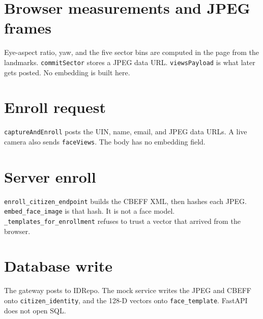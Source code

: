 \clearpage
\section{Browser measurements and JPEG frames}
\label{sec:browser}
\back
{\sffamily\small\color{ink}Eye-aspect ratio, yaw, and the five sector bins are computed in the page from the landmarks.
\texttt{commitSector} stores a JPEG data URL. \texttt{viewsPayload} is what later gets posted. No embedding is built here.}


\clearpage
\section{Enroll request}
\label{sec:enroll-request}
\back
{\sffamily\small\color{ink}\texttt{captureAndEnroll} posts the UIN, name, email, and JPEG data URLs.
A live camera also sends \texttt{faceViews}. The body has no embedding field.}


\clearpage
\section{Server enroll}
\label{sec:enroll-server}
\back
{\sffamily\small\color{ink}\texttt{enroll\_citizen\_endpoint} builds the CBEFF XML, then hashes each JPEG.
\texttt{embed\_face\_image} is that hash. It is not a face model.
\texttt{\_templates\_for\_enrollment} refuses to trust a vector that arrived from the browser.}


\clearpage
\section{Database write}
\label{sec:db-write}
\back
{\sffamily\small\color{ink}The gateway posts to IDRepo. The mock service writes the JPEG and CBEFF onto \texttt{citizen\_identity}, and the 128-D vectors onto \texttt{face\_template}. FastAPI does not open SQL.}


